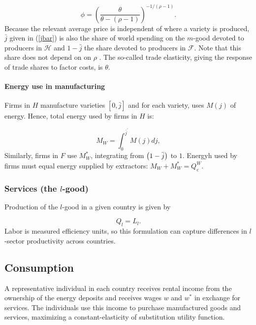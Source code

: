 \documentclass[notitlepage,12pt]{article}
\begin{document}
\begin{equation*}
\phi =\left( \frac{\theta }{\theta -\left( \rho -1\right) }\right)
^{-1/\left( \rho -1\right) }.
\end{equation*}%
Because the relevant average price is independent of where a variety is
produced, $\bar{j}$ given in (\ref{jbar}) is also the share of world
spending on the $m$-good devoted to producers in $\mathcal{H}$ and $1-\bar{j}
$ the share devoted to producers in $\mathcal{F}$. Note that this share does
not depend on on $\rho $ . The so-called trade elasticity, giving the
response of trade shares to factor costs, is $\theta $.

\paragraph{Energy use in manufacturing}

Firms in $H$ manufacture varieties $\left[ 0,\bar{j}\right] $ and for each
variety, uses $M\left( j\right) $ of energy. Hence, total energy used by
firms in $H$ is:

\begin{equation*}
M_{W}=\int_{0}^{\bar{j}^{\prime }}M\left( j\right) dj,
\end{equation*}
Similarly, firms in $F$ use $M_{W}^{\ast }$, integrating from $\left( 1-\bar{%
j}\right) $ to $1$. Energyh used by firms must equal energy supplied by
extractors: $M_{W}+M_{W}^{\ast }=Q_{e}^{W}.$

\subsubsection{Services (the $l$-good)}

Production of the $l$-good in a given country is given by

\begin{equation*}
Q_{l}=L_{l}.
\end{equation*}%
Labor is measured efficiency units, so this formulation can capture
differences in $l$-sector productivity across countries.

\subsection{Consumption}

A representative individual in each country receives rental income from the
ownership of the energy deposits and receives wages $w$ and $w^{\ast }$ in
exchange for services. The individuals use this income to purchase
manufactured goods and services, maximizing a constant-elasticity of
substitution utility function.
\end{document}
